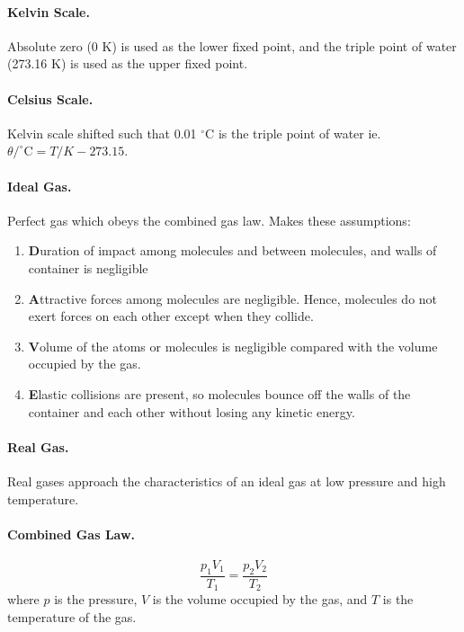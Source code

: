 \documentclass{article}
\begin{document}
\paragraph{Kelvin Scale.} Absolute zero (0 K) is used as the lower fixed point, and the triple point of water (273.16 K) is used as the upper fixed point.

\paragraph{Celsius Scale.} Kelvin scale shifted such that 0.01 $^{\circ}$C is the triple point of water ie. $\theta/^{\circ}\mathrm{C} = T/K - 273.15$.

\paragraph{Ideal Gas.} Perfect gas which obeys the combined gas law. Makes these assumptions:

\begin{enumerate}
\item \textbf{D}uration of impact among molecules and between molecules, and walls of container is negligible
\item \textbf{A}ttractive forces among molecules are negligible. Hence, molecules do not exert forces on each other except when they collide.
\item \textbf{V}olume of the atoms or molecules is negligible compared with the volume occupied by the gas.
\item \textbf{E}lastic collisions are present, so molecules bounce off the walls of the container and each other without losing any kinetic energy.
\end{enumerate}

\paragraph{Real Gas.} Real gases approach the characteristics of an ideal gas at low pressure and high temperature.

\paragraph{Combined Gas Law.} \begin{equation}
\frac{p_1V_1}{T_1} = \frac{p_2V_2}{T_2}
\end{equation} where $p$ is the pressure, $V$ is the volume occupied by the gas, and $T$ is the temperature of the gas.
\end{document}
